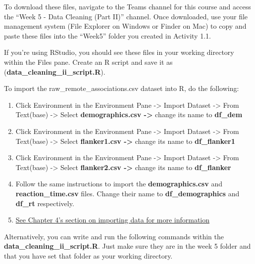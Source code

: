 \documentclass[
]{book}
\providecommand{\tightlist}{%
  \setlength{\itemsep}{0pt}\setlength{\parskip}{0pt}}
\begin{document}
To download these files, navigate to the Teams channel for this course and access the ``Week 5 - Data Cleaning (Part II)'' channel. Once downloaded, use your file management system (File Explorer on Windows or Finder on Mac) to copy and paste these files into the ``Week5'' folder you created in Activity 1.1.

If you're using RStudio, you should see these files in your working directory within the Files pane. Create an R script and save it as (\textbf{data\_cleaning\_ii\_script.R}).

To import the raw\_remote\_associations.csv dataset into R, do the following:

\begin{enumerate}
\def\labelenumi{\arabic{enumi}.}
\tightlist
\item
  Click Environment in the Environment Pane -\textgreater{} Import Dataset -\textgreater{} From Text(base) -\textgreater{} Select \textbf{demographics.csv -\textgreater{}} change its name to \textbf{df\_dem}
\item
  Click Environment in the Environment Pane -\textgreater{} Import Dataset -\textgreater{} From Text(base) -\textgreater{} Select \textbf{flanker1.csv -\textgreater{}} change its name to \textbf{df\_flanker1}
\item
  Click Environment in the Environment Pane -\textgreater{} Import Dataset -\textgreater{} From Text(base) -\textgreater{} Select \textbf{flanker2.csv -\textgreater{}} change its name to \textbf{df\_flanker}
\item
  Follow the same instructions to import the \textbf{demographics.csv} and \textbf{reaction\_time.csv} files. Change their name to \textbf{df\_demographics} and \textbf{df\_rt} respectively.
\item
  \protect\hyperlink{importing}{See Chapter 4's section on importing data for more information}
\end{enumerate}

Alternatively, you can write and run the following commands within the \textbf{data\_cleaning\_ii\_script.R}. Just make sure they are in the week 5 folder and that you have set that folder as your working directory.
\end{document}
